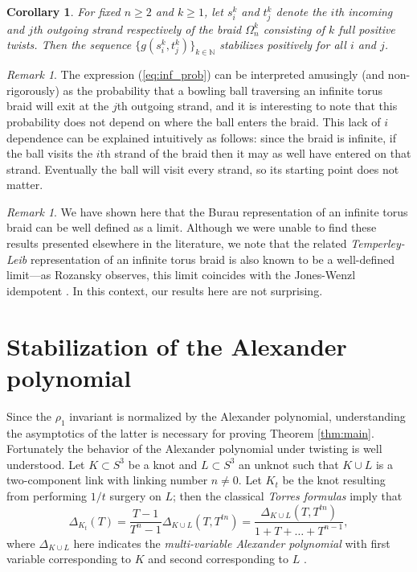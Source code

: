 \documentclass[11pt,hyp,]{nyjm}
\newcommand{\N}{\mathbb{N}}
\numberwithin{thm}{section}
\newtheorem{cor}[thm]{Corollary}
\theoremstyle{definition}
\theoremstyle{remark}
\newtheorem{rmk}[thm]{Remark}
\begin{document}
	\begin{cor}
		\label{thm:prob_stab}
		For fixed $n \geq 2$ and $k \geq 1$, let $s^k_i$ and $t^k_j$ denote the $i$th incoming and $j$th outgoing strand respectively of the braid $\Omega_n^k$ consisting of $k$ full positive twists. Then the sequence $\{g(s^k_i,t^k_j)\}_{k \in \N}$ stabilizes positively for all $i$ and $j$.
	\end{cor}

	\begin{rmk}
		The expression (\ref{eq:inf_prob}) can be interpreted amusingly (and non-rigorously) as the probability that a bowling ball traversing an infinite torus braid will exit at the $j$th outgoing strand, and it is interesting to note that this probability does not depend on where the ball enters the braid. This lack of $i$ dependence can be explained intuitively as follows: since the braid is infinite, if the ball visits the $i$th strand of the braid then it may as well have entered on that strand. Eventually the ball will visit every strand, so its starting point does not matter.
	\end{rmk}
	
	\begin{rmk}
		\label{rem:roz}
		We have shown here that the Burau representation of an infinite torus braid can be well defined as a limit. Although we were unable to find these results presented elsewhere in the literature, we note that the related {\em Temperley-Leib} representation of an infinite torus braid is also known to be a well-defined limit---as Rozansky observes, this limit coincides with the Jones-Wenzl idempotent \cite{roz14}. In this context, our results here are not surprising.
	\end{rmk}
	
	\section{Stabilization of the Alexander polynomial}
	\label{sec:alex}
	
	Since the $\rho_1$ invariant is normalized by the Alexander polynomial, understanding the asymptotics of the latter is necessary for proving Theorem \ref{thm:main}. Fortunately the behavior of the Alexander polynomial under twisting is well understood. Let $K \subset S^3$ be a knot and $L \subset S^3$ an unknot such that $K \cup L$ is a two-component link with linking number $n \neq 0$. Let $K_t$ be the knot resulting from performing $1/t$ surgery on $L$; then the classical {\em Torres formulas} imply that
	\begin{equation}
		\label{eq:torres}
		\Delta_{K_t}(T) = \frac{T - 1}{T^n - 1} \Delta_{K \cup L}(T,T^{tn}) = \frac{\Delta_{K \cup L}(T,T^{tn})}{1 + T + \dots + T^{n - 1}},
	\end{equation}
	where $\Delta_{K \cup L}$ here indicates the {\em multi-variable Alexander polynomial} with first variable corresponding to $K$ and second corresponding to $L$ \cite{tor53, sw04, bamo17-2}.
\end{document}
